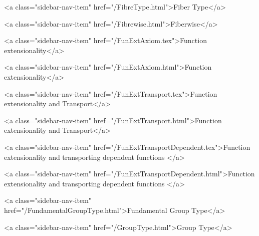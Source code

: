       
    
      
        
          <a class="sidebar-nav-item" href="/FibreType.html">Fiber Type</a>
        
      
    
      
        
          <a class="sidebar-nav-item" href="/Fibrewise.html">Fiberwise</a>
        
      
    
      
        
          <a class="sidebar-nav-item" href="/FunExtAxiom.tex">Function extensionality</a>
        
      
    
      
        
          <a class="sidebar-nav-item" href="/FunExtAxiom.html">Function extensionality</a>
        
      
    
      
        
          <a class="sidebar-nav-item" href="/FunExtTransport.tex">Function extensionality and Transport</a>
        
      
    
      
        
          <a class="sidebar-nav-item" href="/FunExtTransport.html">Function extensionality and Transport</a>
        
      
    
      
        
          <a class="sidebar-nav-item" href="/FunExtTransportDependent.tex">Function extensionality and transporting dependent functions </a>
        
      
    
      
        
          <a class="sidebar-nav-item" href="/FunExtTransportDependent.html">Function extensionality and transporting dependent functions </a>
        
      
    
      
        
          <a class="sidebar-nav-item" href="/FundamentalGroupType.html">Fundamental Group Type</a>
        
      
    
      
        
          <a class="sidebar-nav-item" href="/GroupType.html">Group Type</a>
        
      
    
